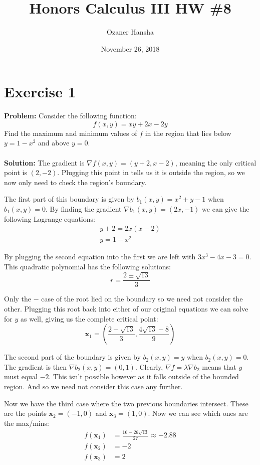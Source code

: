 \documentclass{article}
\begin{document}
\title{Honors Calculus III HW \#8}
\author{Ozaner Hansha}
\date{November 26, 2018}
\maketitle

\section*{Exercise 1}
\textbf{Problem:} Consider the following function:
$$f(x,y)=xy+2x-2y$$
Find the maximum and minimum values of $f$ in the region that lies below $y=1-x^2$ and above $y=0$.
\\\\
\textbf{Solution:} The gradient is $\nabla f(x,y)=(y+2,x-2)$, meaning the only critical point is $(2,-2)$. Plugging this point in tells us it is outside the region, so we now only need to check the region's boundary.

The first part of this boundary is given by $b_1(x,y)=x^2+y-1$ when $b_1(x,y)=0$. By finding the gradient $\nabla b_1(x,y)=(2x,-1)$ we can give the following Lagrange equations:
\begin{gather*}
  y+2=2x(x-2)\\
  y=1-x^2
\end{gather*}

By plugging the second equation into the first we are left with $3x^3-4x-3=0$. This quadratic polynomial has the following solutions:
$$r=\frac{2\pm\sqrt{13}}{3}$$

Only the $-$ case of the root lied on the boundary so we need not consider the other. Plugging this root back into either of our original equations we can solve for $y$ as well, giving us the complete critical point:
$$\mathbf x_1=\left(\frac{2-\sqrt{13}}{3},\frac{4\sqrt{13}-8}{9}\right)$$

The second part of the boundary is given by $b_2(x,y)=y$ when $b_2(x,y)=0$. The gradient is then $\nabla b_2(x,y)=(0,1)$. Clearly, $\nabla f=\lambda\nabla b_2$ means that $y$ must equal $-2$. This isn't possible however as it falls outside of the bounded region. And so we need not consider this case any further.

Now we have the third case where the two previous boundaries intersect. These are the points $\mathbf x_2=(-1,0)$ and $\mathbf x_3=(1,0)$. Now we can see which ones are the max/mins:
\begin{align*}
  f(\mathbf x_1)&=\frac{16-26\sqrt{13}}{27}\approx-2.88\\
  f(\mathbf x_2)&=-2\\
  f(\mathbf x_3)&=2
\end{align*}
\end{document}

